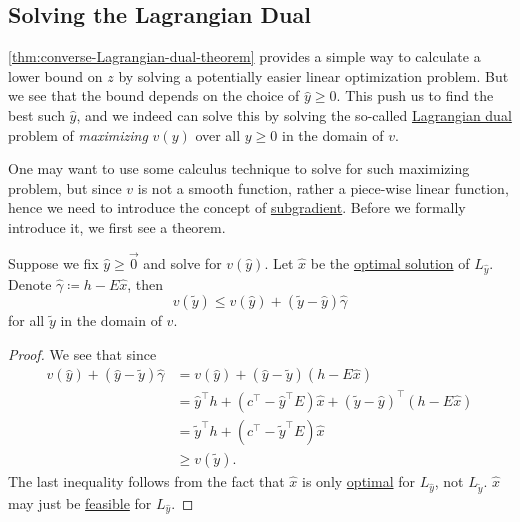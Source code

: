 \subsection{Solving the Lagrangian Dual}
\begin{intuition}
	\autoref{thm:converse-Lagrangian-dual-theorem} provides a simple way to calculate a lower bound on \(z\) by solving a potentially easier linear optimization problem.
	But we see that the bound depends on the choice of \(\hat{y}\geq 0\). This push us to find the best such \(\hat{y}\), and we indeed can solve
	this by solving the so-called \hyperref[def:Lagrangian-dual]{Lagrangian dual} problem of \emph{maximizing} \(v(y)\) over all \(y\geq 0\) in the domain of \(v\).
\end{intuition}

One may want to use some calculus technique to solve for such maximizing problem, but since \(v\) is not a smooth function, rather a piece-wise linear
function, hence we need to introduce the concept of \hyperref[def:subgradient]{subgradient}. Before we formally introduce it, we first see a theorem.

\begin{theorem}\label{thm:lec19-1}
	Suppose we fix \(\hat{y}\geq \vec{0}\) and solve for \(v(\hat{y})\). Let \(\hat{x}\) be the \hyperref[def:optimal-solution]{optimal solution} of \(L_{\hat{y}}\).
	Denote \(\hat{\gamma}\coloneqq h - E \hat{x}\), then
	\[
		v(\widetilde{y})\leq v(\hat{y})+(\widetilde{y} - \hat{y})\hat{\gamma}
	\]
	for all \(\widetilde{y}\) in the domain of \(v\).
	\begin{figure}[H]
		\centering
		\label{fig:subgradient-theorem}
	\end{figure}
\end{theorem}

\begin{proof}
	We see that since
	\[
		\begin{split}
			v(\hat{y})+(\hat{y} - \widetilde{y})\hat{\gamma}&=v(\hat{y})+(\hat{y} - \widetilde{y})(h - E \hat{x})\\
			&= \hat{y}^{\top}h + (c^{\top} - \hat{y}^{\top}E)\hat{x} + (\widetilde{y} - \hat{y})^{\top}(h - E \hat{x})\\
			&= \widetilde{y}^{\top}h + (c^{\top} - \widetilde{y}^{\top} E)\hat{x}\\
			&\geq v(\widetilde{y}).
		\end{split}
	\]
	The last inequality follows from the fact that \(\hat{x}\) is only \hyperref[def:optimal-solution]{optimal} for \(L_{\hat{y}}\), not \(L_{\widetilde{y}}\).
	\(\hat{x}\) may just be \hyperref[def:feasible-solution]{feasible} for \(L_{\hat{y}}\).
\end{proof}

